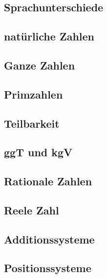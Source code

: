 \subsection{Sprachunterschiede}


\subsection{natürliche Zahlen}


\subsection{Ganze Zahlen}


\subsection{Primzahlen}


\subsection{Teilbarkeit}


\subsection{ggT und kgV}


\subsection{Rationale Zahlen}


\subsection{Reele Zahl}


\subsection{Additionssysteme}


\subsection{Positionssysteme}



